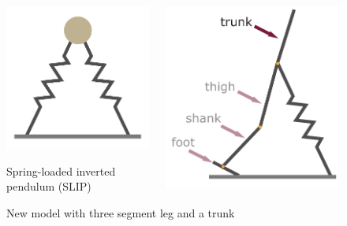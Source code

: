 \documentclass[10pt]{beamer}
\begin{document}
\begin{frame}
\begin{figure}
\begin{overprint}
		\centering
		\begin{columns}
			\begin{column}{.5\textwidth}
				\centering
				\includegraphics[height=.5\textheight]{images/slip/double_SLIP.pdf}
				\caption{Spring-loaded inverted pendulum (SLIP)}				
			\end{column}
			\begin{column}{.5\textwidth}
				\centering
				\includegraphics[height=.5\textheight]{images/new_model/left_3leg_trunk.pdf} 
				\caption{New model with three segment leg and a trunk}
			\end{column}	
		\end{columns}	
		

\end{overprint}
\end{figure}
\end{frame}
\end{document}
